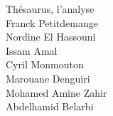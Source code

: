 \documentclass[a4paper, 12pt]{report}
\begin{document}
\begin{titlepage}
	\vspace*{\fill}
	\begin{center}
		{\Huge Thésaurus, l'analyse}\\
		\vspace{\fill}
		Franck Petitdemange \\
		Nordine El Hassouni \\
		Issam Amal \\
		Cyril Monmouton \\
		Marouane Denguiri \\
		Mohamed Amine Zahir \\
		Abdelhamid Belarbi
	\end{center}
	\vspace*{\fill}
	\center{\today}
\end{titlepage}
\end{document}
